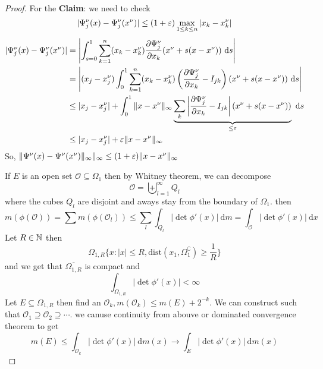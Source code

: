 \begin{proof}
  For the \textbf{Claim}: we need to check
  \[|\Psi^\nu_j(x) - \Psi_j^\nu(x^\nu)| \le (1 + \varepsilon)\max_{1 \le k \le n} |x_k - x_k^\nu|\]
  \begin{align*}
    |\Psi^\nu_j(x) - \Psi_j^\nu(x^\nu)| &= \left|\int_{s=0}^1 \sum_{k=1}^n (x_k - x_k^\nu) \frac{\partial \Psi_j^\nu}{\partial x_k} (x^\nu + s(x - x^\nu)) \ \mathrm{d}s\right| \\
    &=\left|(x_j - x_j^\nu)\int_0^1\sum_{k=1}^n (x_k - x_k^\nu) \left(\frac{\partial\Psi_j^\nu}{\partial{x_k}} - I_{jk}\right)(x^\nu + s(x - x^\nu)) \ \mathrm{d}s\right| \\
    &\le |x_j - x_j^\nu| + \int_0^1 \|x - x^\nu\|_{\infty} \underbrace{\sum_{k} \left|\frac{\partial\Psi_j^\nu}{\partial{x_k}} - I_{jk}\right| (x^\nu + s(x - x^\nu))}_{\le \varepsilon}  \ \mathrm{d}s \\
    &\le |x_j - x_j^\nu| + \varepsilon \|x - x^\nu\|_\infty 
  \end{align*}
  So, $\|\Psi^\nu(x) - \Psi^\nu(x^\nu)\|_\infty\|_\infty \le (1 + \varepsilon)\|x - x^\nu\|_\infty$

  If $E$ is an open set $\mathcal O \subseteq \Omega_1$ then by Whitney theorem, we can decompose 
  \[\mathcal O = \biguplus_{l=1}^\infty Q_l\]
  where the cubes $Q_l$ are disjoint and aways stay from the boundary of $\Omega_1$.
  then
  \[m(\phi(\mathcal O)) = \sum m(\phi(\mathcal O_l)) \le \sum_l\int_{Q_l} |\det \phi'(x)| \ \mathrm{d}m = \int_{\mathcal O}|\det \phi'(x)| \ \mathrm{d}x\]
  Let $R \in \mathbb N$ then 
  \[\Omega_{1, R} \{x : |x| \le R, \mathrm{dist}(x_1, \Omega_1^\complement) \ge \frac1R\}\]
  and we get that $\overline{\Omega_{1, R}}$ is compact and
  \[\int_{\Omega_{1, R}} |\det \phi'(x)| < \infty\]
  Let $E \subseteq \Omega_{1, R}$ then find an $\mathcal{O}_k, m(\mathcal{O}_k) \le m(E) + 2^{-k}$.
  We can construct such that $\mathcal{O}_1 \supseteq \mathcal{O}_2 \supseteq \dotsm$.
  we canuse continuity from abouve or dominated convergence theorem to get
  \[m(E) \le \int_{\mathcal{O}_k} |\det \phi'(x)| \ \mathrm{d}m(x) \to \int_{E} |\det \phi'(x)| \ \mathrm{d}m(x)\]


\end{proof}
